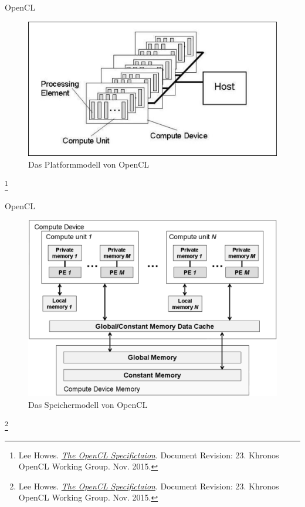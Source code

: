 \documentclass[10pt]{beamer}
\let\svthefootnote\thefootnote
\begin{document}
\begin{frame}{OpenCL}
  \begin{figure}
    \centering
    \includegraphics[width=.9\linewidth]{figures/fg-opencl-platform-model.pdf}
    \caption{Das Platformmodell von OpenCL}
  \end{figure}

  \footnotesize
  \let\thefootnote\relax\footnote{Lee Howes. \href{https://www.khronos.org/registry/OpenCL/specs/opencl-2.0.pdf}{\textit{The OpenCL Specifictaion}}. Document Revision: 23. Khronos OpenCL Working Group. Nov. 2015.}
  \addtocounter{footnote}{-1}\let\thefootnote\svthefootnote\relax
  \normalsize
\end{frame}

\begin{frame}{OpenCL}
  \begin{figure}
    \centering
    \includegraphics[width=.75\linewidth]{figures/fg-opencl-memory-model.pdf}
    \caption{Das Speichermodell von OpenCL}
  \end{figure}

  \footnotesize
  \let\thefootnote\relax\footnote{Lee Howes. \href{https://www.khronos.org/registry/OpenCL/specs/opencl-2.0.pdf}{\textit{The OpenCL Specifictaion}}. Document Revision: 23. Khronos OpenCL Working Group. Nov. 2015.}
  \addtocounter{footnote}{-1}\let\thefootnote\svthefootnote\relax
  \normalsize
\end{frame}
\end{document}

